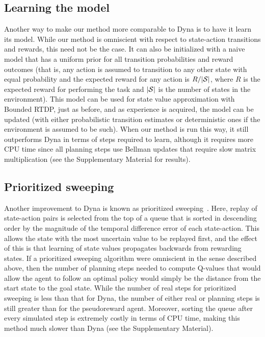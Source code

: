 \documentclass[letterpaper]{article}
\begin{document}
\subsection{Learning the model}

Another way to make our method more comparable to Dyna is to have it learn its model. While our method is omniscient with respect to state-action transitions and rewards, this need not be the case. It can also be initialized with a naive model that has a uniform prior for all transition probabilities and reward outcomes (that is, any action is assumed to transition to any other state with equal probability and the expected reward for any action is $R/|{\cal S}|$, where $R$ is the expected reward for performing the task and $|{\cal S}|$ is the number of states in the environment). This model can be used for state value approximation with Bounded RTDP, just as before, and as experience is acquired, the model can be updated (with either probabilistic transition estimates or deterministic ones if the environment is assumed to be such). When our method is run this way, it still outperforms Dyna in terms of steps required to learn, although it requires more CPU time since all planning steps use Bellman updates that require slow matrix multiplication (see the Supplementary Material for results).

\subsection{Prioritized sweeping}

Another improvement to Dyna is known as prioritized sweeping~\cite{moore1993prioritized}. Here, replay of state-action pairs is selected from the top of a queue that is sorted in descending order by the magnitude of the temporal difference error of each state-action. This allows the state with the most uncertain value to be replayed first, and the effect of this is that learning of state values propagates backwards from rewarding states. If a prioritized sweeping algorithm were omniscient in the sense described above, then the number of planning steps needed to compute Q-values that would allow the agent to follow an optimal policy would simply be the distance from the start state to the goal state. While the number of real steps for prioritized sweeping is less than that for Dyna, the number of either real or planning steps is still greater than for the pseudoreward agent. Moreover, sorting the queue after every simulated step is extremely costly in terms of CPU time, making this method much slower than Dyna (see the Supplementary Material).
\end{document}
